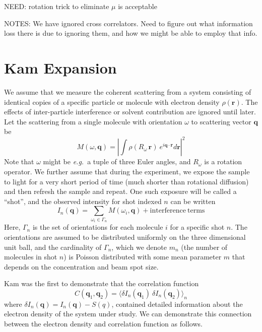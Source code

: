 \documentclass[aps,prl,preprint,groupedaddress]{revtex4-1}
\def\*#1{\mathbf{#1}}
\begin{document}
NEED:  rotation trick to eliminate $\mu$ is acceptable

NOTES: We have ignored cross correlators. Need to figure out what information loss there is due to ignoring them, and how we might be able to employ that info.

\section{Kam Expansion}

We assume that we measure the coherent scattering from a system consisting of identical copies of a specific particle or molecule with electron density $\rho(\*{r})$. The effects of inter-particle interference or solvent contribution are ignored until later. Let the scattering from a single molecule with orientation $\omega$ to scattering vector $\*{q}$ be
\begin{equation} \label{molecular-scattering}
M( \omega, \*{q} ) = \left| \int \rho(R_\omega \, \*{r}) \> e^{ i \*{q} \cdot \*{r} } d\*r \right|^2
\end{equation}
Note that $\omega$ might be \textit{e.g.}~a tuple of three Euler angles, and $R_\omega$ is a rotation operator. We further assume that during the experiment, we expose the sample to light for a very short period of time (much shorter than rotational diffusion) and then refresh the sample and repeat. One such exposure will be called a ``shot'', and the observed intensity for shot indexed $n$ can be written
\[
I_n ( \*q ) = \sum_{\omega_i \in \Gamma_n} M( \omega_i, \*{q} ) + \mathrm{interference\ terms}
\]
Here, $\Gamma_n$ is the set of orientations for each molecule $i$ for a specific shot $n$. The orientations are assumed to be distributed uniformly on the three dimensional unit ball, and the cardinality of $\Gamma_n$, which we denote $m_n$ (the number of molecules in shot $n$) is Poisson distributed with some mean parameter $m$ that depends on the concentration and beam spot size.

Kam was the first to demonstrate that the correlation function
\begin{equation}\label{correlation}
C( \*q_1, \*q_2 ) = \big\langle \delta I_n ( \*q_1 ) \> \delta I_n ( \*q_2 ) \big\rangle_n
\end{equation}
where $\delta I_n ( \*q ) = I_n ( \*q ) - S( q )$, contained detailed information about the electron density of the system under study. We can demonstrate this connection between the electron density and correlation function as follows.
\end{document}
